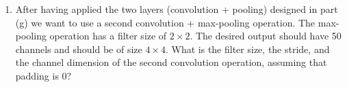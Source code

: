 \begin{Q}
\begin{enumerate}
\item{After having applied the  two layers (convolution + pooling) designed in part (g)  we want to use  a second convolution + max-pooling operation. The max-pooling operation has a filter size of $2\times 2$. The desired output should have 50 channels and should be of size $4 \times 4$. What is the filter size, the stride, and the channel dimension of the second convolution operation, assuming that padding is 0?
}


\end{enumerate}

\end{Q}